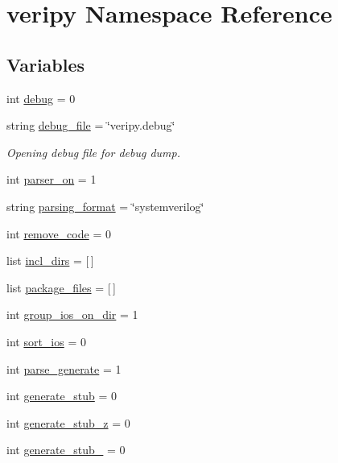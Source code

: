 \hypertarget{namespaceveripy}{\section{veripy Namespace Reference}
\label{namespaceveripy}
}
\subsection*{Variables}
\begin{DoxyCompactItemize}
\item 
int \hyperlink{namespaceveripy_aa31f673a176e6344d30ade070309153d}{debug} = 0
\item 
string \hyperlink{namespaceveripy_a0d00d319a78d1019f3fe9eecfe1add32}{debug\-\_\-file} = \char`\"{}veripy.\-debug\char`\"{}
\begin{DoxyCompactList}\small\item\em Opening debug file for debug dump. \end{DoxyCompactList}\item 
int \hyperlink{namespaceveripy_ae24d8c06b7040a72197b627d31e98657}{parser\-\_\-on} = 1
\item 
string \hyperlink{namespaceveripy_a2741464a2b91f4bed59350a121937e21}{parsing\-\_\-format} = \char`\"{}systemverilog\char`\"{}
\item 
int \hyperlink{namespaceveripy_af1eba550ad186f9ce48ced0faa2b8cf7}{remove\-\_\-code} = 0
\item 
list \hyperlink{namespaceveripy_a7d5b541d0e30b5abbc5760e3ea7b4da2}{incl\-\_\-dirs} = \mbox{[}$\,$\mbox{]}
\item 
list \hyperlink{namespaceveripy_a5c1ad0dd8b61a07185f3e77b9912fad6}{package\-\_\-files} = \mbox{[}$\,$\mbox{]}
\item 
int \hyperlink{namespaceveripy_ad4429b3a6163a9c588ca2433f0831fa1}{group\-\_\-ios\-\_\-on\-\_\-dir} = 1
\item 
int \hyperlink{namespaceveripy_add6f0c3ebf250f985c69973dd91397c2}{sort\-\_\-ios} = 0
\item 
int \hyperlink{namespaceveripy_a5d3c8544e0b626679631fadceac2ccb8}{parse\-\_\-generate} = 1
\item 
int \hyperlink{namespaceveripy_a69c679478700bfe8e617efd46659b04b}{generate\-\_\-stub} = 0
\item 
int \hyperlink{namespaceveripy_aeed0f7abed041e5ca9bbf9eba4a24416}{generate\-\_\-stub\-\_\-z} = 0
\item 
int \hyperlink{namespaceveripy_a4629f2bdb1a9239da0eb7ef127e1e48d}{generate\-\_\-stub\-\_} = 0

\end{DoxyCompactItemize}
